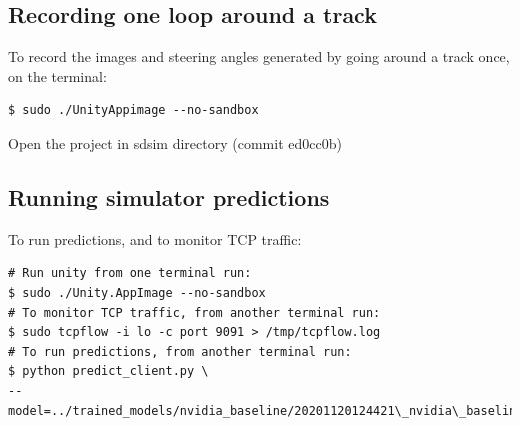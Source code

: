 \subsection{Recording one loop around a track}

To record the images and steering angles generated by going around a track once, on the terminal:
\begin{verbatim}
$ sudo ./UnityAppimage --no-sandbox
\end{verbatim}
Open the project in sdsim directory (commit ed0cc0b)

\subsection{Running simulator predictions}
\label{running-simulator-predictions}

To run predictions, and to monitor TCP traffic:
\begin{verbatim}
# Run unity from one terminal run:
$ sudo ./Unity.AppImage --no-sandbox
# To monitor TCP traffic, from another terminal run:
$ sudo tcpflow -i lo -c port 9091 > /tmp/tcpflow.log
# To run predictions, from another terminal run:
$ python predict_client.py \
--model=../trained_models/nvidia_baseline/20201120124421\_nvidia\_baseline.h5
\end{verbatim}

